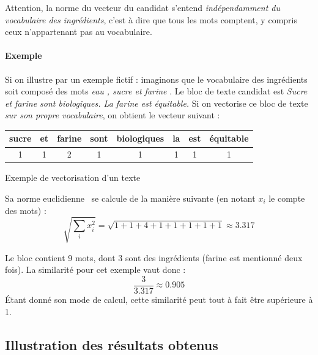                 Attention, la norme du vecteur du candidat s'entend \emph{indépendamment du vocabulaire des ingrédients}, c'est à dire que tous les mots comptent, y compris ceux n'appartenant pas au vocabulaire.

                \paragraph{Exemple}
                Si on illustre par un exemple fictif : imaginons que le vocabulaire des ingrédients soit composé des mots \emph{\og eau \fg, \og sucre \fg et \og farine \fg}.
                Le bloc de texte candidat est \emph{\og Sucre et farine sont biologiques. La farine est équitable.\fg}
                Si on vectorise ce bloc de texte \emph{sur son propre vocabulaire}, on obtient le vecteur suivant : 

                \bigskip
                \begin{minipage}{\textwidth}
                \captionsetup{type=table}
                \centering
                \begin{tabular}{cccccccc}
                    \toprule
                    sucre & et & farine & sont & biologiques & la & est & équitable \\
                    \midrule
                    1 & 1 & 2 & 1 & 1 & 1 & 1 & 1 \\
                    \bottomrule
                \end{tabular}
                \caption{Exemple de vectorisation d'un texte}
                \bigskip
                \end{minipage}                

                Sa norme euclidienne~\cite{norm_wiki} se calcule de la manière suivante (en notant $x_{i}$ le compte des mots) : 
                \[\sqrt{\sum_{i}^{} x_{i}^{2}} = \sqrt{1 + 1 + 4 + 1 + 1 + 1 + 1 + 1} \approx 3.317\]

                Le bloc contient 9 mots, dont 3 sont des ingrédients (\og farine \fg est mentionné deux fois). La similarité pour cet exemple vaut donc :
                \[\frac{3}{3.317} \approx 0.905\]
                \'{E}tant donné son mode de calcul, cette similarité peut tout à fait être supérieure à 1.

        \subsection{Illustration des résultats obtenus}
    

